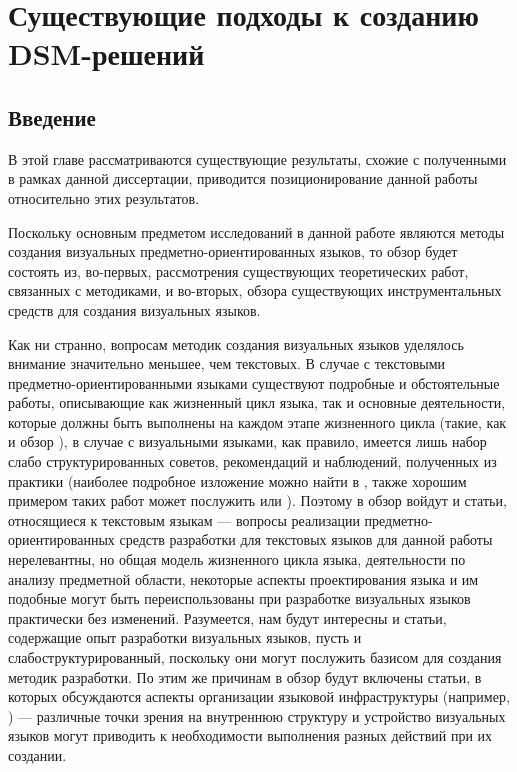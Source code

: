 \chapter{Существующие подходы к созданию DSM-решений}
\label{chapter2}

\section{Введение}
В этой главе рассматриваются существующие результаты, схожие с полученными в рамках 
данной диссертации, приводится позиционирование данной работы относительно этих результатов.

Поскольку основным предметом исследований в данной работе являются методы создания 
визуальных предметно-ориентированных языков, то обзор будет состоять из, во-первых, 
рассмотрения существующих теоретических работ, связанных с методиками, и во-вторых, 
обзора существующих инструментальных средств для создания визуальных языков.

Как ни странно, вопросам методик создания визуальных языков уделялось внимание 
значительно меньшее, чем текстовых. В случае с текстовыми предметно-ориентированными
языками существуют подробные и обстоятельные работы, описывающие как жизненный цикл
языка, так и основные деятельности, которые должны быть выполнены на каждом этапе
жизненного цикла (такие, как \cite{mernik2005and} и обзор \cite{van2000domain}), в 
случае с визуальными языками, как правило, имеется лишь набор слабо структурированных
советов, рекомендаций и наблюдений, полученных из практики (наиболее подробное изложение 
можно найти в \cite{kelly2008domain}, также хорошим примером таких работ может послужить 
\cite{voelter2009best} или \cite{luoma2004defining}). Поэтому в обзор войдут и статьи, 
относящиеся к текстовым языкам --– вопросы реализации предметно-ориентированных средств 
разработки для текстовых языков для данной работы нерелевантны, но общая модель жизненного 
цикла языка, деятельности по анализу предметной области, некоторые аспекты проектирования 
языка и им подобные могут быть переиспользованы при разработке визуальных языков практически 
без изменений. Разумеется, нам будут интересны и статьи, содержащие опыт разработки 
визуальных языков, пусть и слабоструктурированный, поскольку они могут послужить базисом 
для создания методик разработки. По этим же причинам в обзор будут включены статьи, 
в которых обсуждаются аспекты организации языковой инфраструктуры (например, \cite{atkinson2003model}) 
--– различные точки зрения на внутреннюю структуру и устройство визуальных языков 
могут приводить к необходимости выполнения разных действий при их создании.

